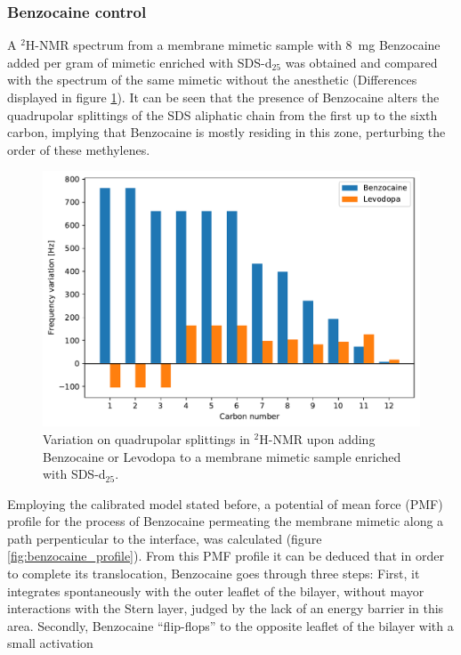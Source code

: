 \documentclass[3p,preprint,review]{elsarticle}
\begin{document}
	\subsubsection{Benzocaine control}
	\label{sec:benzo}
	
	A $^2$H-NMR spectrum from a membrane mimetic sample with \SI{8}{mg}
	Benzocaine added per gram of mimetic enriched with SDS-d$_{25}$ was obtained
	and compared
	with the spectrum of the same mimetic without the anesthetic (Differences
	displayed in figure
	\ref{fig:sds_benzocaine}). It can be seen that the presence
	of
	Benzocaine alters the quadrupolar splittings of the SDS aliphatic chain 
	from the first up to the sixth carbon, implying that Benzocaine is mostly
	residing in this zone, perturbing the order of these methylenes.
	\begin{figure}[htb]
		\centering
		\includegraphics[width=\columnwidth]{sds_variation}
		\caption{Variation on quadrupolar splittings in $^2$H-NMR upon adding
			Benzocaine or Levodopa to a membrane mimetic sample enriched with
			SDS-d$_{25}$.}
		\label{fig:sds_benzocaine}
	\end{figure}
	Employing the calibrated model stated before, a potential of mean force (PMF)
	profile for the process of Benzocaine permeating the membrane mimetic along a
	path perpenticular to the interface, was calculated
	(figure \ref{fig:benzocaine_profile}). From this PMF profile it can be deduced
	that
	in order to complete its
	translocation, Benzocaine goes through three steps:
	First, it integrates spontaneously with the outer leaflet of the bilayer,
	without mayor interactions with the Stern layer, judged by the lack of an
	energy barrier in this area. Secondly, Benzocaine
	``flip-flops'' to the opposite leaflet of the bilayer with a small activation
\end{document}
